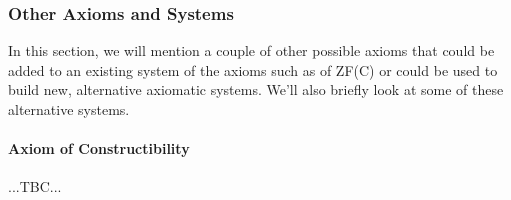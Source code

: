 








\subsubsection{Other Axioms and Systems}
In this section, we will mention a couple of other possible axioms that could be added to an existing system of the axioms such as of ZF(C) or could be used to build new, alternative axiomatic systems. We'll also briefly look at some of these alternative systems.


\paragraph{Axiom of Constructibility} ...TBC...






